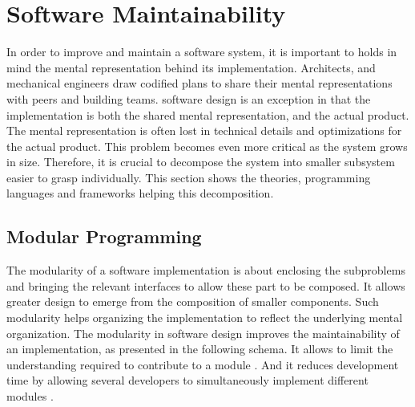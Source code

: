 \section{Software Maintainability} \label{chapter3:software-maintainability}


In order to improve and maintain a software system, it is important to holds in mind the mental representation behind its implementation.
Architects, and mechanical engineers draw codified plans to share their mental representations with peers and building teams.
software design is an exception in that the implementation is both the shared mental representation, and the actual product.
The mental representation is often lost in technical details and optimizations for the actual product.
This problem becomes even more critical as the system grows in size.
Therefore, it is crucial to decompose the system into smaller subsystem easier to grasp individually.
This section shows the theories, programming languages and frameworks helping this decomposition.


\subsection{Modular Programming} \label{chapter3:software-maintainability:modular-programming}

The modularity of a software implementation is about enclosing the subproblems and bringing the relevant interfaces to allow these part to be composed.
It allows greater design to emerge from the composition of smaller components.
Such modularity helps organizing the implementation to reflect the underlying mental organization.
The modularity in software design improves the maintainability of an implementation, as presented in the following schema.
It allows to limit the understanding required to contribute to a module \cite{Stevens1974}.
And it reduces development time by allowing several developers to simultaneously implement different modules \cite{Wong2009,Cataldo2006}.


